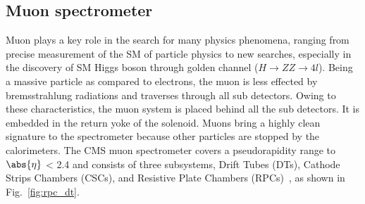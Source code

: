 \subsection{Muon spectrometer}
Muon plays a key role in the search for many physics phenomena, ranging from precise measurement of the SM of particle physics to new searches, especially in the discovery of SM Higgs boson through golden channel ($H\rightarrow ZZ \rightarrow 4l$). Being a massive particle as compared to electrons, the muon is less effected by bremsstrahlung radiations and traverses through all sub detectors. Owing to these characteristics, the muon system is placed behind all the sub detectors. It is embedded in the return yoke of the solenoid. Muons bring a highly clean signature to the spectrometer because other particles are stopped by the calorimeters. The CMS muon spectrometer covers a pseudorapidity range to $\abs{\eta}$ < 2.4 and consists of three subsystems, Drift Tubes (DTs), Cathode Strips Chambers (CSCs), and Resistive Plate Chambers (RPCs)~\cite{cms_muon}, as shown in Fig.~\ref{fig:rpc_dt}.   

